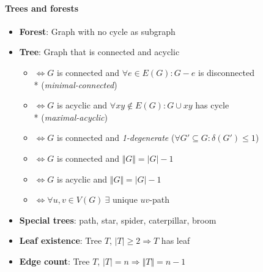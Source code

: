 \paragraph{Trees and forests}
\begin{itemize}
  \item \textbf{Forest}: Graph with no cycle as subgraph
  \item \textbf{Tree}: Graph that is connected and acyclic
  \begin{itemize}
    \item $ \Leftrightarrow G $ is connected and $ \forall e \in E(G): G-e $ is disconnected  \\*
      \phantom{$ \Leftrightarrow $} (\emph{minimal-connected})
    \item $ \Leftrightarrow G $ is acyclic and $ \forall xy \not \in E(G) : G \cup xy $ has cycle \\*
      \phantom{$ \Leftrightarrow $} (\emph{maximal-acyclic})
    \item $ \Leftrightarrow G $ is connected and \emph{1-degenerate} ($ \forall G' \subseteq G : \delta(G') \leq 1 $) 
    \item $ \Leftrightarrow G $ is connected and $ \Vert G \Vert = \vert G \vert - 1 $
    \item $ \Leftrightarrow G $ is acyclic and $ \Vert G \Vert = \vert G \vert - 1 $
    \item $ \Leftrightarrow \forall u,v \in V(G) \ \exists $ unique $ uv $-path
  \end{itemize}
  \item \textbf{Special trees}: path, star, spider, caterpillar, broom
  \item \textbf{Leaf existence}: Tree $ T $, $ \vert T \vert \geq 2 \Rightarrow T $ has leaf
  \item \textbf{Edge count}: Tree $ T $, $ \vert T \vert = n \Rightarrow \Vert T \Vert = n-1 $ 
\end{itemize}

